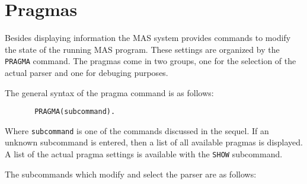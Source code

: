 \section{Pragmas} %

\label{prag.sec}
Besides displaying information the MAS system provides 
commands to modify the state of the running MAS program. 
These settings are organized by the \verb/PRAGMA/ command. 
The pragmas come in two groups, 
one for the selection of the actual parser and 
one for debuging purposes. 

The general syntax of the pragma command is as follows:
\begin{verbatim}
       PRAGMA(subcommand).
\end{verbatim}
Where \verb/subcommand/ is one of the commands discussed in
the sequel. If an unknown subcommand is entered, then 
a list of all available pragmas is displayed. 
A list of the actual pragma settings is available with the 
\verb/SHOW/ subcommand.

The subcommands which modify and select the parser 
are as follows:

